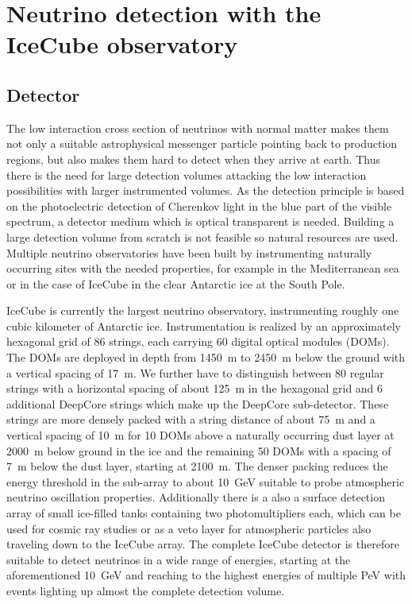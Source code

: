 \chapter{Neutrino detection with the IceCube observatory}

\section{Detector}
The low interaction cross section of neutrinos with normal matter makes them not only a suitable astrophysical messenger particle pointing back to production regions, but also makes them hard to detect when they arrive at earth.
Thus there is the need for large detection volumes attacking the low interaction possibilities with larger instrumented volumes.
As the detection principle is based on the photoelectric detection of Cherenkov light in the blue part of the visible spectrum, a detector medium which is optical transparent is needed.
Building a large detection volume from scratch is not feasible so natural resources are used.
Multiple neutrino observatories have been built by instrumenting naturally occurring sites with the needed properties, for example in the Mediterranean sea or in the case of IceCube in the clear Antarctic ice at the South Pole.

IceCube is currently the largest neutrino observatory, instrumenting roughly one cubic kilometer of Antarctic ice.
Instrumentation is realized by an approximately hexagonal grid of 86 strings, each carrying 60 digital optical modules (DOMs).
The DOMs are deployed in depth from \SI{1450}{\m} to \SI{2450}{m} below the ground with a vertical spacing of \SI{17}{\m}.
We further have to distinguish between 80 regular strings with a horizontal spacing of about \SI{125}{\m} in the hexagonal grid and 6 additional DeepCore strings which make up the DeepCore sub-detector.
These strings are more densely packed with a string distance of about \SI{75}{\m} and a vertical spacing of \SI{10}{\m} for 10 DOMs above a naturally occurring dust layer at \SI{2000}{\m} below ground in the ice and the remaining 50 DOMs with a spacing of \SI{7}{\m} below the dust layer, starting at \SI{2100}{\m}.
The denser packing reduces the energy threshold in the sub-array to about \SI{10}{\GeV} suitable to probe atmospheric neutrino oscillation properties.
Additionally there is a also a surface detection array of small ice-filled tanks containing two photomultipliers each, which can be used for cosmic ray studies or as a veto layer for atmospheric particles also traveling down to the IceCube array.
The complete IceCube detector is therefore suitable to detect neutrinos in a wide range of energies, starting at the aforementioned \SI{10}{\GeV} and reaching to the highest energies of multiple \si{\peta\eV} with events lighting up almost the complete detection volume.

